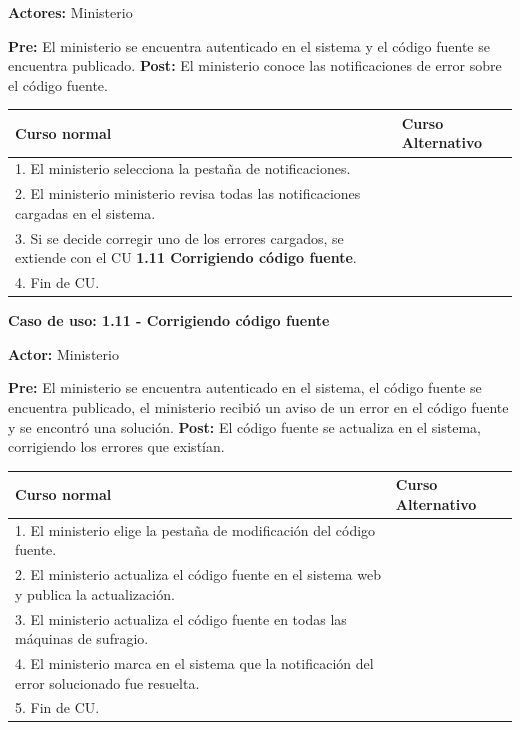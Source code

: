 \textbf{Actores:} Ministerio 

\textbf{Pre:} El ministerio se encuentra autenticado en el sistema y el código fuente se encuentra publicado.
\textbf{Post:} El ministerio conoce las notificaciones de error sobre el código fuente.


\begin{table}[h!]
	
 \begin{tabular}{|p{7.5cm} | p{7.5cm}|} 
 \hline
 \textbf{Curso normal} & \textbf{Curso Alternativo} \\
 \hline


1. El ministerio selecciona la pestaña de notificaciones. & \\
\hline


2. El ministerio ministerio revisa todas las notificaciones cargadas en el sistema. & \\
\hline


3. Si se decide corregir uno de los errores cargados, se extiende con el CU \textbf{1.11 Corrigiendo código fuente}. & \\
\hline


4. Fin de CU. & \\
\hline




 \end{tabular}

\end{table}


\textbf{Caso de uso: 1.11 - Corrigiendo código fuente}

\textbf{Actor:} Ministerio

\textbf{Pre:} El ministerio se encuentra autenticado en el sistema, el código fuente se encuentra publicado, el ministerio recibió un aviso de un error en el código fuente y se encontró una solución.
\textbf{Post:} El código fuente se actualiza en el sistema, corrigiendo los errores que existían.

\begin{table}[h!]
	
 \begin{tabular}{|p{7.5cm} | p{7.5cm}|} 
 \hline
 \textbf{Curso normal} & \textbf{Curso Alternativo} \\
 \hline



1. El ministerio elige la pestaña de modificación del código fuente. & \\
\hline

2. El ministerio actualiza el código fuente en el sistema web y publica la actualización. & \\
\hline

3. El ministerio actualiza el código fuente en todas las máquinas de sufragio. & \\
\hline


4. El ministerio marca en el sistema que la notificación del error solucionado fue resuelta. & \\
\hline

5. Fin de CU. & \\
\hline

\end{tabular}
\end{table}

